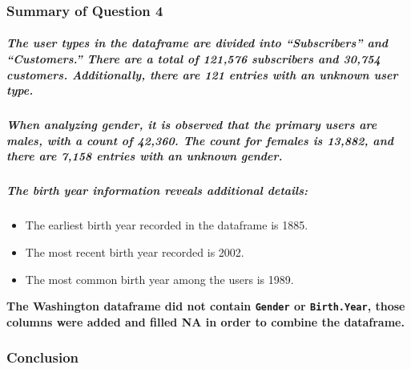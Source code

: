 \documentclass[11pt]{article}
\providecommand{\tightlist}{%
      \setlength{\itemsep}{0pt}\setlength{\parskip}{0pt}}
\begin{document}
    \hypertarget{summary-of-question-4}{%
\subsubsection{Summary of Question 4}\label{summary-of-question-4}}

\hypertarget{the-user-types-in-the-dataframe-are-divided-into-subscribers-and-customers.-there-are-a-total-of-121576-subscribers-and-30754-customers.-additionally-there-are-121-entries-with-an-unknown-user-type.}{%
\subparagraph{The user types in the dataframe are divided into
``Subscribers'' and ``Customers.'' There are a total of 121,576
subscribers and 30,754 customers. Additionally, there are 121 entries
with an unknown user
type.}\label{the-user-types-in-the-dataframe-are-divided-into-subscribers-and-customers.-there-are-a-total-of-121576-subscribers-and-30754-customers.-additionally-there-are-121-entries-with-an-unknown-user-type.}}

\hypertarget{when-analyzing-gender-it-is-observed-that-the-primary-users-are-males-with-a-count-of-42360.-the-count-for-females-is-13882-and-there-are-7158-entries-with-an-unknown-gender.}{%
\subparagraph{When analyzing gender, it is observed that the primary
users are males, with a count of 42,360. The count for females is
13,882, and there are 7,158 entries with an unknown
gender.}\label{when-analyzing-gender-it-is-observed-that-the-primary-users-are-males-with-a-count-of-42360.-the-count-for-females-is-13882-and-there-are-7158-entries-with-an-unknown-gender.}}

\hypertarget{the-birth-year-information-reveals-additional-details}{%
\subparagraph{The birth year information reveals additional
details:}\label{the-birth-year-information-reveals-additional-details}}

\begin{itemize}
\tightlist
\item
  The earliest birth year recorded in the dataframe is 1885.
\item
  The most recent birth year recorded is 2002.
\item
  The most common birth year among the users is 1989.
\end{itemize}

\textbf{The Washington dataframe did not contain \texttt{Gender} or
\texttt{Birth.Year}, those columns were added and filled NA in order to
combine the dataframe.}

    \hypertarget{conclusion}{%
\subsubsection{Conclusion}\label{conclusion}}
\end{document}
